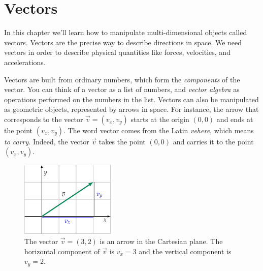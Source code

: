 
%
%

\chapter{Vectors}
\label{chapter:vectors}

In this chapter we'll learn how to manipulate multi-dimensional objects called vectors.						
Vectors are the precise way to describe directions in space.
We need vectors in order to describe physical quantities like forces, velocities, and accelerations.

Vectors are built from ordinary numbers,
which form the \emph{components} of the vector.
You can think of a vector as a list of numbers,
and \emph{vector algebra} as operations
performed on the numbers in the list.
Vectors can also be manipulated as geometric objects,
represented by arrows in space.
For instance, the arrow that corresponds to the vector $\vec{v}=(v_x,v_y)$ starts at the origin $(0,0)$
and ends at the point $(v_x,v_y)$.
The word vector comes from the Latin \emph{vehere},
which means \emph{to carry}.
Indeed, the vector $\vec{v}$ takes the point $(0,0)$ and carries it to the point $(v_x,v_y)$.

\begin{figure}[H]
	\centering
	\includegraphics[width=0.4\textwidth]{figures/vectors/vector_components.pdf}
	\vspace{-2mm}
	\caption{	The vector $\vec{v}=(3,2)$ is an arrow in the Cartesian plane.
			The horizontal component of $\vec{v}$ is $v_x=3$
			and the vertical component  is $v_y=2$.}
	\label{fig:vector_components}
\end{figure}




